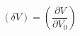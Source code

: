 \begin{equation}
\label{eq:deltaV}
\left(\delta V\right) = \left( \frac{\partial{V}}{\partial{V_0}}\right)
\end{equation}